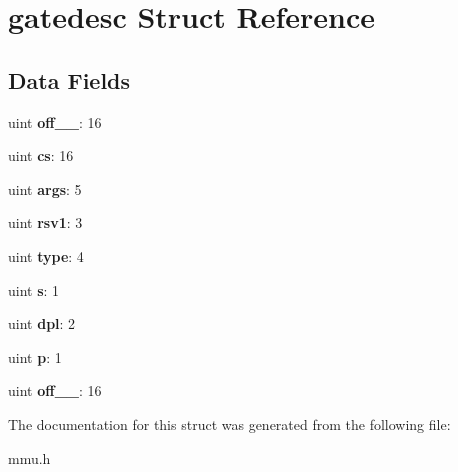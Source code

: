 \hypertarget{structgatedesc}{}\section{gatedesc Struct Reference}
\label{structgatedesc}
\subsection*{Data Fields}
\begin{DoxyCompactItemize}
\item 
\mbox{\label{structgatedesc_a4f7268ba32b6a8b3963aa6d23e51af59}} 
uint {\bfseries off\+\_\+\_}\+: 16
\item 
\mbox{\label{structgatedesc_a53e768c461dce9cc97048e7d19351af1}} 
uint {\bfseries cs}\+: 16
\item 
\mbox{\label{structgatedesc_a9b41bea284fe0922c440f4c253e926ff}} 
uint {\bfseries args}\+: 5
\item 
\mbox{\label{structgatedesc_ad11779f5ce40e53a8feb3dfdaf3f0ee5}} 
uint {\bfseries rsv1}\+: 3
\item 
\mbox{\label{structgatedesc_a41d6e5fb9bb27699bdb7d729c67ff32c}} 
uint {\bfseries type}\+: 4
\item 
\mbox{\label{structgatedesc_a54d731df342be3a775cc847a3dab1a53}} 
uint {\bfseries s}\+: 1
\item 
\mbox{\label{structgatedesc_a4c62f5618440769c78ed976cae23c13d}} 
uint {\bfseries dpl}\+: 2
\item 
\mbox{\label{structgatedesc_a5f754b650dc96be286cbc74e69da6a81}} 
uint {\bfseries p}\+: 1
\item 
\mbox{\label{structgatedesc_af388a77c8f2a8a8c0bd1ca74a7dbaef7}} 
uint {\bfseries off\+\_\+\_}\+: 16
\end{DoxyCompactItemize}


The documentation for this struct was generated from the following file\+:\begin{DoxyCompactItemize}
\item 
mmu.\+h\end{DoxyCompactItemize}
